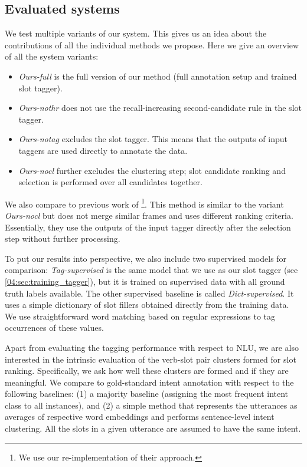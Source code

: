 \subsection{Evaluated systems}
We test multiple variants of our system.
This gives us an idea about the contributions of all the individual methods we propose.
Here we give an overview of all the system variants:
\begin{itemize}[nosep,leftmargin=10pt]
    \item \textit{Ours-full} is the full version of our method (full annotation setup and trained slot tagger).
    \item \textit{Ours-nothr} does not use the recall-increasing second-candidate rule in the slot tagger.
    \item \textit{Ours-notag} excludes the slot tagger. This means that the outputs of input taggers are used directly to annotate the data.
    \item \textit{Ours-nocl} further excludes the clustering step; slot candidate ranking and selection is performed over all candidates together.
\end{itemize}
We also compare to previous work of \citet{chen2014leveraging}\footnote{We use our re-implementation of their approach.}.
This method is similar to the variant \textit{Ours-nocl} but does not merge similar frames and uses different ranking criteria.
Essentially, they use the outputs of the input tagger directly after the selection step without further processing.

To put our results into perspective, we also include two supervised models for comparison:
\emph{Tag-supervised} is the same model that we use as our slot tagger (see \ref{04:sec:training_tagger}), but it is trained on supervised data with all ground truth labels available.
The other supervised baseline is called \emph{Dict-supervised}.
It uses a simple dictionary of slot fillers obtained directly from the training data.
We use straightforward word matching based on regular expressions to tag occurrences of these values.

Apart from evaluating the tagging performance with respect to NLU, we are also interested in the intrinsic evaluation of the verb-slot pair clusters formed for slot ranking.
Specifically, we ask how well these clusters are formed and if they are meaningful.
We compare to gold-standard intent annotation with respect to the following baselines: (1) a majority baseline (assigning the most frequent intent class to all instances), and (2) a simple method that represents the utterances as averages of respective word embeddings and performs sentence-level intent clustering.
All the slots in a given utterance are assumed to have the same intent.

